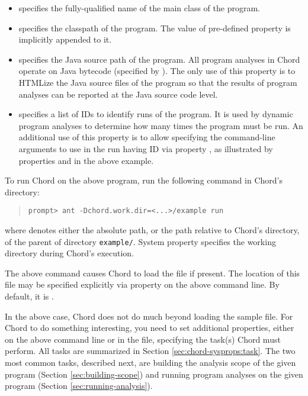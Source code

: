 \begin{itemize}
\item
{} specifies the fully-qualified name of the main class of the
program.
\item
{} specifies the classpath of the program.
The value of pre-defined property  is implicitly appended
to it.
\item
{} specifies the Java source path of the program.
All program analyses in Chord operate on Java bytecode (specified by ).
The only use of this property is to HTMLize the Java source files of the program so that the
results of program analyses can be reported at the Java source code level.
\item
{} specifies a list of IDs to identify runs of the program.
It is used by dynamic program analyses to determine how many times the program must be run.
An additional use of this property is to allow specifying the command-line arguments to use
in the run having ID  via property , as illustrated by
properties  and  in the above example.
\end{itemize}

To run Chord on the above program, run the following command in Chord's  directory:

\begin{quote}
\begin{verbatim}
prompt> ant -Dchord.work.dir=<...>/example run
\end{verbatim}
\end{quote}

\noindent where  denotes either the absolute path, or the path relative to Chord's  directory,
of the parent of directory {\tt example/}.
System property  specifies the working directory during Chord's execution.

The above command causes Chord to load the  file if present.
The location of this file may be specified explicitly via property
 on the above command line.
By default, it is .

In the above case, Chord does not do much beyond loading the sample  file.
For Chord to do something interesting, you need to set additional properties, either
on the above command line or in the  file, specifying the task(s)
Chord must perform.
All tasks are summarized in Section \ref{sec:chord-sysprops:task}.
The two most common tasks, described next, are building the analysis scope of the given program (Section \ref{sec:building-scope})
and running program analyses on the given program (Section \ref{sec:running-analysis}).

